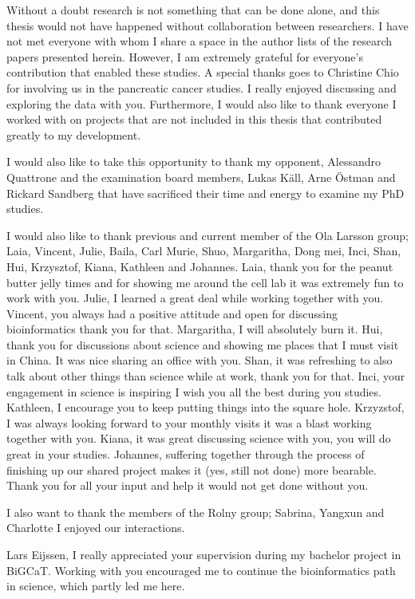 \documentclass[12pt,openany]{book}
\begin{document}
Without a doubt research is not something that can be done alone, and
this thesis would not have happened without collaboration between
researchers. I have not met everyone with whom I share a space in the
author lists of the research papers presented herein. However, I am
extremely grateful for everyone's contribution that enabled these
studies. A special thanks goes to Christine Chio for involving us in the
pancreatic cancer studies. I really enjoyed discussing and exploring the
data with you. Furthermore, I would also like to thank everyone I worked
with on projects that are not included in this thesis that contributed
greatly to my development.

I would also like to take this opportunity to thank my opponent,
Alessandro Quattrone and the examination board members, Lukas Käll, Arne
Östman and Rickard Sandberg that have sacrificed their time and energy
to examine my PhD studies.

I would also like to thank previous and current member of the Ola
Larsson group; Laia, Vincent, Julie, Baila, Carl Murie, Shuo,
Margaritha, Dong mei, Inci, Shan, Hui, Krzysztof, Kiana, Kathleen and
Johannes. Laia, thank you for the peanut butter jelly times and for
showing me around the cell lab it was extremely fun to work with you.
Julie, I learned a great deal while working together with you. Vincent,
you always had a positive attitude and open for discussing
bioinformatics thank you for that. Margaritha, I will absolutely burn
it. Hui, thank you for discussions about science and showing me places
that I must visit in China. It was nice sharing an office with you.
Shan, it was refreshing to also talk about other things than science
while at work, thank you for that. Inci, your engagement in science is
inspiring I wish you all the best during you studies. Kathleen, I
encourage you to keep putting things into the square hole. Krzyzstof, I
was always looking forward to your monthly visits it was a blast working
together with you. Kiana, it was great discussing science with you, you
will do great in your studies. Johannes, suffering together through the
process of finishing up our shared project makes it (yes, still not
done) more bearable. Thank you for all your input and help it would not
get done without you.

I also want to thank the members of the Rolny group; Sabrina, Yangxun
and Charlotte I enjoyed our interactions.

Lars Eijssen, I really appreciated your supervision during my bachelor
project in BiGCaT. Working with you encouraged me to continue the
bioinformatics path in science, which partly led me here.
\end{document}
